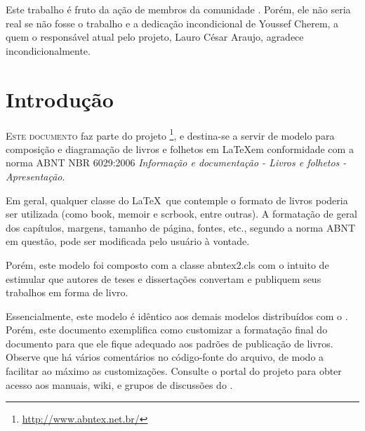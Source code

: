 \documentclass[
	10pt,				%
	openright,			%
	twoside,			%
	a5paper,			%
	english,			%
	french,				%
	spanish,			%
	brazil,				%
	sumario=tradicional
]{abntex2}
\renewcommand{\textual}{%
  \pagestyle{abntbookheadings}%
  \aliaspagestyle{chapter}{abntbookchapfirst}%
  \nouppercaseheads%
  \bookmarksetup{startatroot}%
}
\begin{document}
\begin{agradecimentos}
Este trabalho é fruto da ação de membros da comunidade \abnTeX. Porém, ele não
seria real se não fosse o trabalho e a dedicação incondicional de Youssef
Cherem, a quem o responsável atual pelo projeto, Lauro César Araujo, agradece
incondicionalmente.
\end{agradecimentos}

\listoffigures*
\cleardoublepage

\listoftables*
\cleardoublepage

\tableofcontents*
\cleardoublepage

\mainmatter

\chapter*[Introdução]{Introdução}

\lettrine[nindent=0.35em,lhang=0.40,loversize=0.3]{E}{ste documento} faz parte
do projeto \abnTeX\footnote{\url{http://www.abntex.net.br/}}, e destina-se
a servir de modelo para composição e diagramação de livros e folhetos em
\LaTeX em conformidade com a norma ABNT NBR 6029:2006 \emph{Informação e
documentação - Livros e folhetos - Apresentação}. 

Em geral, qualquer classe do \LaTeX\ que contemple o formato de livros poderia
ser utilizada (como \textsf{book}, \textsf{memoir} e \textsf{scrbook}, entre
outras). A formatação de geral dos capítulos, margens, tamanho de página,
fontes, etc., segundo a norma ABNT em questão, pode ser modificada pelo usuário
à vontade.

Porém, este modelo foi composto com a classe \textsf{abntex2.cls} com o intuito
de estimular que autores de teses e dissertações convertam e publiquem seus
trabalhos em forma de livro. 

Essencialmente, este modelo é idêntico aos demais modelos distribuídos com o
\abnTeX. Porém, este documento exemplifica como customizar a formatação final do
documento para que ele fique adequado aos padrões de publicação de livros.
Observe que há vários comentários no código-fonte do arquivo, de modo a
facilitar ao máximo as customizações. Consulte o portal do projeto para obter
acesso aos manuais, wiki, e grupos de discussões do \abnTeX.
\end{document}
